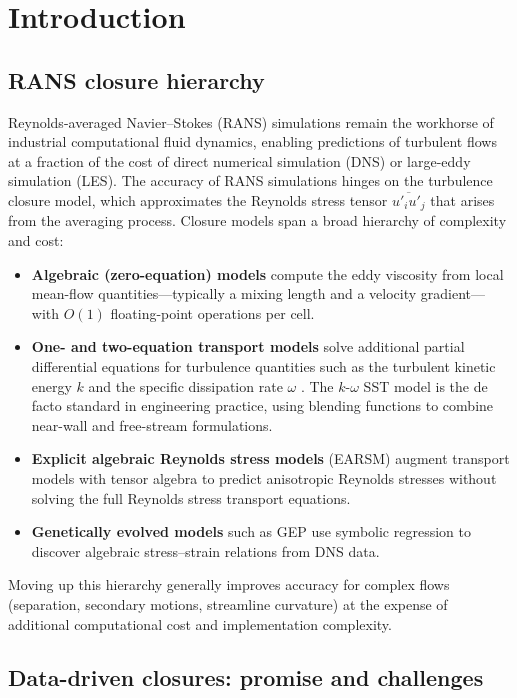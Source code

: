 \section{Introduction}
\label{sec:introduction}

\subsection{RANS closure hierarchy}

Reynolds-averaged Navier--Stokes (RANS) simulations remain the workhorse of industrial computational fluid dynamics, enabling predictions of turbulent flows at a fraction of the cost of direct numerical simulation (DNS) or large-eddy simulation (LES).
The accuracy of RANS simulations hinges on the turbulence closure model, which approximates the Reynolds stress tensor $\overline{u'_i u'_j}$ that arises from the averaging process.
Closure models span a broad hierarchy of complexity and cost:
\begin{itemize}
    \item \textbf{Algebraic (zero-equation) models} compute the eddy viscosity from local mean-flow quantities---typically a mixing length and a velocity gradient---with $O(1)$ floating-point operations per cell.
    \item \textbf{One- and two-equation transport models} solve additional partial differential equations for turbulence quantities such as the turbulent kinetic energy $k$ and the specific dissipation rate $\omega$ \citep{Wilcox1988,Menter1994}. The $k$-$\omega$ SST model \citep{Menter1994} is the de facto standard in engineering practice, using blending functions to combine near-wall and free-stream formulations.
    \item \textbf{Explicit algebraic Reynolds stress models} (EARSM) augment transport models with tensor algebra to predict anisotropic Reynolds stresses without solving the full Reynolds stress transport equations.
    \item \textbf{Genetically evolved models} such as GEP \citep{Weatheritt2016} use symbolic regression to discover algebraic stress--strain relations from DNS data.
\end{itemize}
Moving up this hierarchy generally improves accuracy for complex flows (separation, secondary motions, streamline curvature) at the expense of additional computational cost and implementation complexity.

\subsection{Data-driven closures: promise and challenges}

